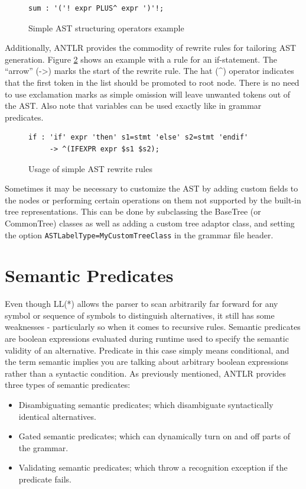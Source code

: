 \begin{figure}[h!]
\begin{verbatim}
sum : '('! expr PLUS^ expr ')'!;
\end{verbatim}
\caption{Simple AST structuring operators example}
\label{code:astOperators}
\end{figure}

Additionally, ANTLR provides the commodity of rewrite rules for tailoring AST
generation. Figure \ref{code:astRewriteRules} shows an example with a rule for
an if-statement. The ``arrow'' (->) marks the start of the rewrite rule. The hat
(\^{}) operator indicates that the first token in the list should be promoted to
root node. There is no need to use exclamation marks as simple omission will
leave unwanted tokens out of the AST. Also note that variables can be used
exactly like in grammar predicates.

\begin{figure}[h!]
\begin{verbatim}
if : 'if' expr 'then' s1=stmt 'else' s2=stmt 'endif'
     -> ^(IFEXPR expr $s1 $s2);
\end{verbatim}
\caption{Usage of simple AST rewrite rules}
\label{code:astRewriteRules}
\end{figure}

Sometimes it may be necessary to customize the AST by adding custom fields to
the nodes or performing certain operations on them not supported by the built-in
tree representations. This can be done by subclassing the BaseTree (or
CommonTree) classes as well as adding a custom tree adaptor class, and setting
the option \verb!ASTLabelType=MyCustomTreeClass! in the grammar file header.

\section{Semantic Predicates}
\label{sect:antlr:semantic_preds}
Even though LL(*) allows the parser to scan arbitrarily far forward for any symbol or sequence of symbols to distinguish alternatives, it still has some weaknesses - particularly so when it comes to recursive rules. Semantic predicates are boolean expressions evaluated during runtime used to specify the semantic validity of an alternative. Predicate in this case simply means conditional, and the term semantic implies you are talking about arbitrary boolean expressions rather than a syntactic condition.  As previously mentioned, ANTLR provides three types of semantic predicates:
\begin{itemize}
\item Disambiguating semantic predicates; which disambiguate syntactically identical alternatives.
\item Gated semantic predicates; which can dynamically turn on and off parts of the grammar.
\item Validating semantic predicates; which throw a recognition exception if the predicate fails.
\end{itemize}

